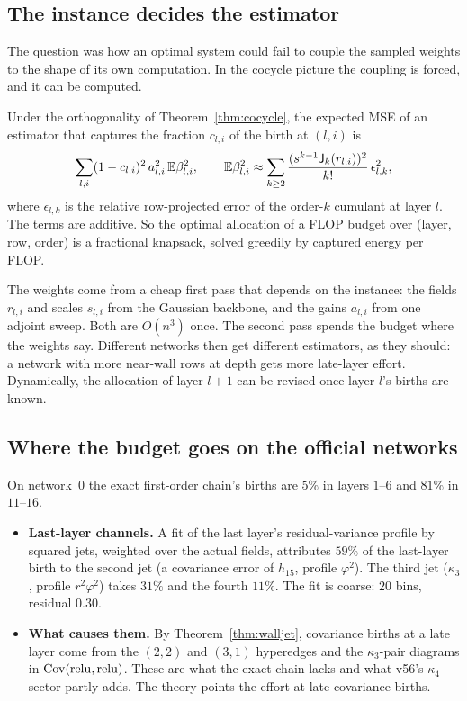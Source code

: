 \subsection{The instance decides the estimator}
The question was how an optimal system could fail to couple the sampled weights to the shape of its own computation. In the cocycle
picture the coupling is forced, and it can be computed.
\begin{proposition}\label{prop:knapsack}
Under the orthogonality of Theorem~\ref{thm:cocycle}, the expected MSE of an estimator that captures the fraction $c_{l,i}$ of the birth at
$(l,i)$ is
\[
\sum_{l,i}(1-c_{l,i})^2\,a_{l,i}^2\,\mathbb E\beta_{l,i}^2 ,\qquad \mathbb E\beta_{l,i}^2\approx\sum_{k\ge2}\frac{(s^{k-1}\mathsf J_k(r_{l,i}))^2}{k!}\,\epsilon_{l,k}^2 ,
\]
where $\epsilon_{l,k}$ is the relative row-projected error of the order-$k$ cumulant at layer $l$. The terms are additive. So the optimal
allocation of a FLOP budget over (layer, row, order) is a fractional knapsack, solved greedily by captured energy per FLOP.
\end{proposition}
The weights come from a cheap first pass that depends on the instance: the fields $r_{l,i}$ and scales $s_{l,i}$ from the Gaussian
backbone, and the gains $a_{l,i}$ from one adjoint sweep. Both are $O(n^3)$ once. The second pass spends the budget where the weights
say. Different networks then get different estimators, as they should: a network with more near-wall rows at depth gets more late-layer
effort. Dynamically, the allocation of layer $l+1$ can be revised once layer $l$'s births are known.

\subsection{Where the budget goes on the official networks}
On network~0 the exact first-order chain's births are $5\%$ in layers $1$--$6$ and $81\%$ in $11$--$16$.
\begin{itemize}[leftmargin=*]
\item \textbf{Last-layer channels.} A fit of the last layer's residual-variance profile by squared jets, weighted over the actual
fields, attributes $59\%$ of the last-layer birth to the second jet (a covariance error of $h_{15}$, profile $\varphi^2$). The third jet
($\kappa_3$, profile $r^2\varphi^2$) takes $31\%$ and the fourth $11\%$. The fit is coarse: $20$ bins, residual $0.30$.
\item \textbf{What causes them.} By Theorem~\ref{thm:walljet}, covariance births at a late layer come from the $(2,2)$ and $(3,1)$
hyperedges and the $\kappa_3$-pair diagrams in $\operatorname{Cov}(\operatorname{relu},\operatorname{relu})$. These are what the exact chain lacks and what v56's $\kappa_4$ sector
partly adds. The theory points the effort at late covariance births.
\end{itemize}
